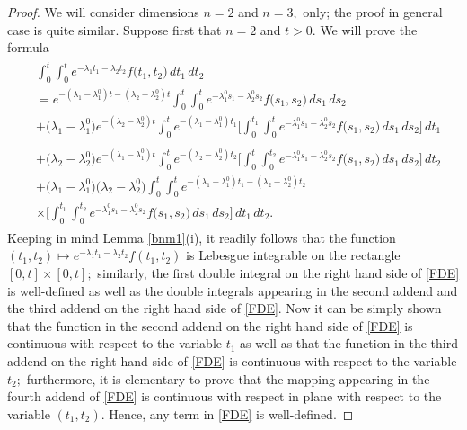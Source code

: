 \documentclass{amsart}
\theoremstyle{definition}
\theoremstyle{remark}
\numberwithin{equation}{section}
\begin{document}
\begin{proof}
We will consider dimensions $n=2$ and $n=3,$ only; the proof in general case is quite similar.
Suppose first that $n=2 $ and $t>0.$ We will prove the formula{\small
\begin{align}\label{FDE}
\begin{split}
& \int^{t}_{0}\int^{t}_{0}e^{-\lambda_{1}t_{1}-\lambda_{2}t_{2}}f\bigl( t_{1},t_{2}\bigr)\, dt_{1}\, dt_{2}
\\ & =e^{-(\lambda_{1}-\lambda_{1}^{0})t-(\lambda_{2}-\lambda_{2}^{0})t}\int^{t}_{0}\int^{t}_{0}e^{-\lambda_{1}^{0}s_{1}-\lambda_{2}^{0}s_{2}}f\bigl( s_{1},s_{2}\bigr)\, ds_{1}\, ds_{2} 
\\& +\bigl( \lambda_{1}-\lambda_{1}^{0}\bigr)e^{-(\lambda_{2}-\lambda_{2}^{0})t}\int^{t}_{0}e^{-(\lambda_{1}-\lambda_{1}^{0})t_{1}}\Biggl[ \int^{t_{1}}_{0}\int^{t}_{0}e^{-\lambda_{1}^{0}s_{1}-\lambda_{2}^{0}s_{2}}f\bigl( s_{1},s_{2}\bigr)\, ds_{1} \, ds_{2}\Biggr]\, dt_{1} \\
& \\& +\bigl( \lambda_{2}-\lambda_{2}^{0}\bigr)e^{-(\lambda_{1}-\lambda_{1}^{0})t}\int^{t}_{0}e^{-(\lambda_{2}-\lambda_{2}^{0})t_{2}}\Biggl[ \int^{t}_{0}\int^{t_{2}}_{0}e^{-\lambda_{1}^{0}s_{1}-\lambda_{2}^{0}s_{2}}f\bigl( s_{1},s_{2}\bigr)\, ds_{1} \, ds_{2}\Biggr]\, dt_{2}
\\& +\bigl( \lambda_{1}-\lambda_{1}^{0}\bigr)\bigl( \lambda_{2}-\lambda_{2}^{0}\bigr)\int^{t}_{0}\int^{t}_{0}e^{-(\lambda_{1}-\lambda_{1}^{0})t_{1}-(\lambda_{2}-\lambda_{2}^{0})t_{2}}
\\& \times \Biggl[ \int^{t_{1}}_{0}\int^{t_{2}}_{0}e^{-\lambda_{1}^{0}s_{1}-\lambda_{2}^{0}s_{2}}f\bigl( s_{1},s_{2}\bigr)\, ds_{1}\, ds_{2}  \Biggr]\, dt_{1}\, dt_{2}.
\end{split}
\end{align}}
Keeping in mind Lemma \ref{bnm1}(i), it readily follows that the function $(t_{1},t_{2})\mapsto e^{-\lambda_{1}t_{1}-\lambda_{2}t_{2}}f( t_{1},t_{2})$ is Lebesgue integrable on the rectangle $[0,t] \times [0,t];$ similarly, the first double integral on the right hand side of \eqref{FDE} is well-defined as well as the double integrals appearing in the second addend and the third addend on the right hand side of \eqref{FDE}. Now it can be simply shown that the function in the second addend on the right hand side of \eqref{FDE} is continuous with respect to the variable $t_{1}$ as well as that the function in the third addend on the right hand side of \eqref{FDE} is continuous with respect to the variable $t_{2};$ furthermore, it is elementary to prove that the mapping appearing in the fourth addend of \eqref{FDE} is continuous with respect in plane with respect to the variable $(t_{1},t_{2}).$ Hence, any term in \eqref{FDE} is well-defined. 


\end{proof}
\end{document}
